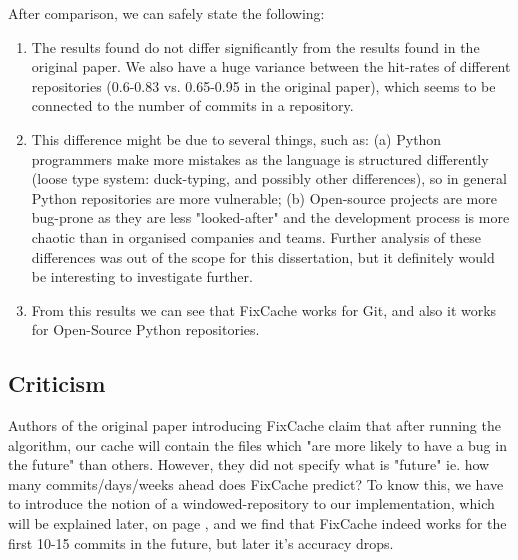 \documentclass[12pt,twoside,notitlepage]{report}
\newcommand{\fxch}{FixCache }
\begin{document}
After comparison, we can safely state the following:
\begin{enumerate}
\item The results found do not differ significantly from the results found in the original paper. We also have a huge variance between the hit-rates of different repositories (0.6-0.83 vs. 0.65-0.95 in the original paper), which seems to be connected to the number of commits in a repository.
\item This difference might be due to several things, such as: (a) Python programmers make more mistakes as the language is structured differently (loose type system: duck-typing, and possibly other differences), so in general Python repositories are more vulnerable; (b) Open-source projects are more bug-prone as they are less "looked-after" and the development process is more chaotic than in organised companies and teams. Further analysis of these differences was out of the scope for this dissertation, but it definitely would be interesting to investigate further.
\item From this results we can see that \fxch works for Git, and also it works for Open-Source Python repositories.
\end{enumerate}
\subsection{Criticism}
Authors of the original paper introducing \fxch claim that after running the algorithm, our cache will contain the files which "are more likely to have a bug in the future" than others. However, they did not specify what is "future" ie. how many commits/days/weeks ahead does \fxch predict? To know this, we have to introduce the notion of a windowed-repository to our implementation, which will be explained later, on page \pageref{windowedrep}, and we find that \fxch indeed works for the first 10-15 commits in the future, but later it's accuracy drops.
\end{document}
